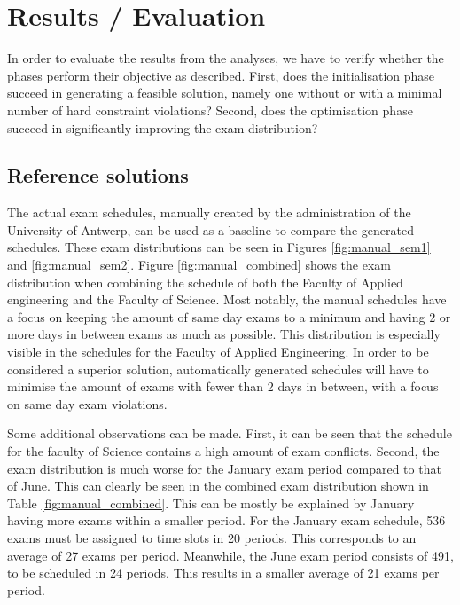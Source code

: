 
\section{Results / Evaluation}\label{sec:results}

In order to evaluate the results from the analyses, we have to verify whether the phases perform their objective as described. First, does the initialisation phase succeed in generating a feasible solution, namely one without or with a minimal number of hard constraint violations? Second, does the optimisation phase succeed in significantly improving the exam distribution?

\subsection{Reference solutions}

The actual exam schedules, manually created by the administration of the University of Antwerp, can be used as a baseline to compare the generated schedules. These exam distributions can be seen in Figures \ref{fig:manual_sem1} and \ref{fig:manual_sem2}. Figure \ref{fig:manual_combined} shows the exam distribution when combining the schedule of both the Faculty of Applied engineering and the Faculty of  Science. Most notably, the manual schedules have a focus on keeping the amount of same day exams to a minimum and having 2 or more days in between exams as much as possible. This distribution is especially visible in the schedules for the Faculty of Applied Engineering. In order to be considered a superior solution, automatically generated schedules will have to minimise the amount of exams with fewer than 2 days in between, with a focus on same day exam violations.

Some additional observations can be made. First, it can be seen that the schedule for the faculty of Science contains a high amount of exam conflicts. Second, the exam distribution is much worse for the January exam period compared to that of June. This can clearly be seen in the combined exam distribution shown in Table \ref{fig:manual_combined}. This can be mostly be explained by January having more exams within a smaller period. For the January exam schedule, 536 exams must be assigned to time slots in 20 periods. This corresponds to an average of 27 exams per period. Meanwhile, the June exam period consists of 491, to be scheduled in 24 periods. This results in a smaller average of 21 exams per period.

